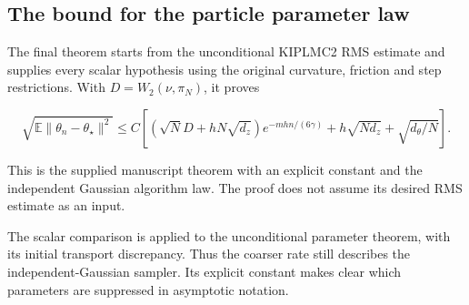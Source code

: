 \documentclass[11pt,a4paper]{report}
\begin{document}
\subsection{\texorpdfstring{The bound for the particle parameter law}{The bound for the particle parameter law}}
\label{report-step-KIPLMC-OBABOPaperRate-lean-4}


The final theorem starts from the unconditional KIPLMC2 RMS estimate and supplies every scalar hypothesis using the original curvature, friction and step restrictions. With \(D=W_2(\nu,\pi_N)\), it proves

\[\sqrt{\mathbb E\lVert\theta_n-\theta_\star\rVert^2}\le C\left[(\sqrt ND+hN\sqrt{d_z})e^{-mhn/(6\gamma)}+h\sqrt{Nd_z}+\sqrt{d_\theta/N}\right].\]

This is the supplied manuscript theorem with an explicit constant and the independent Gaussian algorithm law. The proof does not assume its desired RMS estimate as an input.



The scalar comparison is applied to the unconditional parameter theorem, with its initial transport discrepancy. Thus the coarser rate still describes the independent-Gaussian sampler. Its explicit constant makes clear which parameters are suppressed in asymptotic notation.
\end{document}
